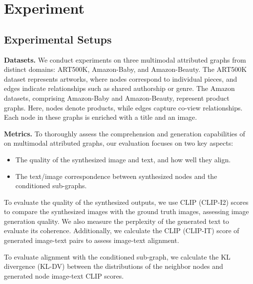 \section{Experiment}
\label{sec:experiment}

\subsection{Experimental Setups}
\noindent\textbf{Datasets.} We conduct experiments on three multimodal attributed graphs from distinct domains: ART500K, Amazon-Baby, and Amazon-Beauty. The ART500K dataset represents artworks, where nodes correspond to individual pieces, and edges indicate relationships such as shared authorship or genre. The Amazon datasets, comprising Amazon-Baby and Amazon-Beauty, represent product graphs. Here, nodes denote products, while edges capture co-view relationships. Each node in these graphs is enriched with a title and an image.

\noindent\textbf{Metrics.} To thoroughly assess the comprehension and generation capabilities of \Ours on multimodal attributed graphs, our evaluation focuses on two key aspects:

\begin{itemize} 
\item The quality of the synthesized image and text, and how well they align. 
\item The text/image correspondence between synthesized nodes and the conditioned sub-graphs.
\end{itemize}

To evaluate the quality of the synthesized outputs, we use CLIP (CLIP-I2) scores to compare the synthesized images with the ground truth images, assessing image generation quality. We also measure the perplexity of the generated text to evaluate its coherence. Additionally, we calculate the CLIP (CLIP-IT) score of generated image-text pairs to assess image-text alignment.

To evaluate alignment with the conditioned sub-graph, we calculate the KL divergence (KL-DV) between the distributions of the neighbor nodes and generated node image-text CLIP scores.

